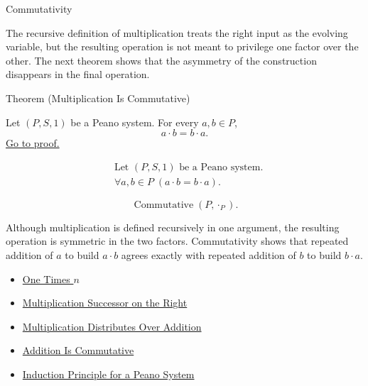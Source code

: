 \begin{topicbox}{Commutativity}
\begin{exposition}
The recursive definition of multiplication treats the right input as the
evolving variable, but the resulting operation is not meant to privilege one
factor over the other. The next theorem shows that the asymmetry of the
construction disappears in the final operation.
\end{exposition}

\begin{theorembox}{Theorem (Multiplication Is Commutative)}
\begin{theorem}
\label{thm:multiplication-commutative}
Let $(P,S,1)$ be a Peano system. For every $a,b \in P$,
\[
a \cdot b = b \cdot a.
\]
\hyperref[prf:multiplication-commutative]{Go to proof.}
\end{theorem}
\end{theorembox}

\begin{remark*}
\[
\begin{aligned}
&\text{Let } (P,S,1) \text{ be a Peano system.}\\
&\forall a,b \in P\;(a \cdot b = b \cdot a).
\end{aligned}
\]
\end{remark*}

\begin{remark*}
\[
\operatorname{Commutative}(P,\cdot_P).
\]
\end{remark*}

\begin{remark*}[Interpretation]
Although multiplication is defined recursively in one argument, the resulting
operation is symmetric in the two factors. Commutativity shows that repeated
addition of $a$ to build $a \cdot b$ agrees exactly with repeated addition of
$b$ to build $b \cdot a$.
\end{remark*}

\begin{dependencies}
\begin{itemize}
  \item \hyperref[thm:one-times-n]{One Times $n$}
  \item \hyperref[thm:multiplication-successor-on-right]{Multiplication Successor on the Right}
  \item \hyperref[thm:multiplication-distributes-over-addition]{Multiplication Distributes Over Addition}
  \item \hyperref[thm:addition-commutative]{Addition Is Commutative}
  \item \hyperref[thm:induction-principle-for-peano-system]{Induction Principle for a Peano System}
\end{itemize}
\end{dependencies}
\end{topicbox}

